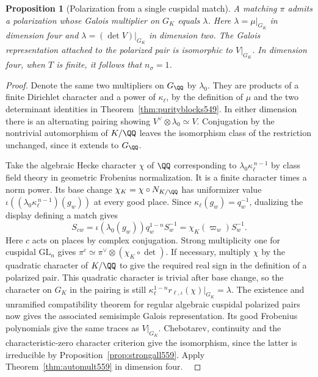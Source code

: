 \documentclass[a4paper,11pt]{article}
\newtheorem{proposition}{Proposition}[section]
\theoremstyle{definition}
\theoremstyle{remark}
\numberwithin{equation}{section}
\begin{document}
\begin{proposition}[Polarization from a single cuspidal match]
\leavevmode\label{prop:onecompanion560}
A matching \(\pi\) admits a polarization whose Galois multiplier
on \(G_K\) equals \(\lambda\). Here \(\lambda=\mu|_{G_K}\)
in dimension four and \(\lambda=(\det V)|_{G_K}\) in dimension
two. The Galois representation attached to the polarized pair
is isomorphic to \(V|_{G_K}\). In dimension four, when \(T\)
is finite, it follows that \(n_\sigma=1\).
\end{proposition}
\begin{proof}
Denote the same two multipliers on \(G_\QQ\) by \(\lambda_0\).
They are products of a finite Dirichlet character and a power of
\(\kappa_\ell\), by the definition of \(\mu\) and the two
determinant identities in Theorem~\ref{thm:purityblocks549}.
In either dimension there is an alternating pairing showing
\(V^\vee\otimes\lambda_0\simeq V\). Conjugation by the
nontrivial automorphism of \(K/\QQ\) leaves the isomorphism
class of the restriction unchanged, since it extends to
\(G_\QQ\).

Take the algebraic Hecke character \(\chi\) of \(\QQ\)
corresponding to \(\lambda_0\kappa_\ell^{\,n-1}\) by class
field theory in geometric Frobenius normalization. It is a
finite character times a norm power. Its base change
\(\chi_K=\chi\circ N_{K/\QQ}\) has uniformizer value
\(\iota((\lambda_0\kappa_\ell^{\,n-1})(g_w))\) at every good
place. Since \(\kappa_\ell(g_w)=q_w^{-1}\), dualizing the
display defining a match gives
\[
 S_{cw}=\iota(\lambda_0(g_w))q_w^{1-n}S_w^{-1}
       =\chi_K(\varpi_w)S_w^{-1}.
\]
Here \(c\) acts on places by complex conjugation.
Strong multiplicity one for cuspidal \(\mathrm{GL}_n\) gives
\(\pi^c\simeq\pi^\vee\otimes(\chi_K\circ\det)\).
If necessary, multiply \(\chi\) by the quadratic character of
\(K/\QQ\) to give the required real sign in the definition of
a polarized pair. This quadratic character is trivial after
base change, so the character on \(G_K\) in the pairing is
still
\(\kappa_\ell^{1-n}r_{\ell,\iota}(\chi)|_{G_K}=\lambda\).
The existence and unramified compatibility theorem for regular
algebraic cuspidal polarized pairs now gives the associated
semisimple Galois representation. Its good Frobenius
polynomials give the same traces as \(V|_{G_K}\). Chebotarev,
continuity and the characteristic-zero character criterion give
the isomorphism, since the latter is irreducible by
Proposition~\ref{prop:strongall559}. Apply
Theorem~\ref{thm:automult559} in dimension four.
~\cite{XII-IX-mult560,XII-IX-blggt560}
\end{proof}
\end{document}
